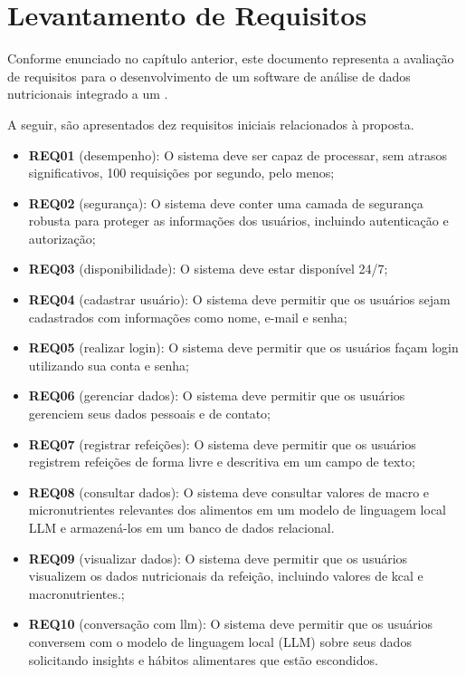 \chapter{Levantamento de Requisitos}\label{cap:2-lev-req}

Conforme enunciado no capítulo anterior, este documento representa a avaliação de requisitos para o desenvolvimento de um software de análise de dados nutricionais integrado a um .

A seguir, são apresentados dez requisitos iniciais relacionados à proposta.

\begin{itemize}
    \item \textbf{REQ01} (desempenho): O sistema deve ser capaz de processar, sem atrasos significativos, 100 requisições por segundo, pelo menos;
    \item \textbf{REQ02} (segurança): O sistema deve conter uma camada de segurança robusta para proteger as informações dos usuários, incluindo autenticação e autorização;
    \item \textbf{REQ03} (disponibilidade): O sistema deve estar disponível 24/7;
    \item \textbf{REQ04} (cadastrar usuário): O sistema deve permitir que os usuários sejam cadastrados com informações como nome, e-mail e senha;
    \item \textbf{REQ05} (realizar login): O sistema deve permitir que os usuários façam login utilizando sua conta e senha;
    \item \textbf{REQ06} (gerenciar dados): O sistema deve permitir que os usuários gerenciem seus dados pessoais e de contato;
    \item \textbf{REQ07} (registrar refeições): O sistema deve permitir que os usuários registrem refeições de forma livre e descritiva em um campo de texto;
    \item \textbf{REQ08} (consultar dados): O sistema deve consultar valores de macro e micronutrientes relevantes dos alimentos em um modelo de linguagem local LLM e armazená-los em um banco de dados relacional.
    \item \textbf{REQ09} (visualizar dados): O sistema deve permitir que os usuários visualizem os dados nutricionais da refeição, incluindo valores de kcal e macronutrientes.;
    \item \textbf{REQ10} (conversação com llm): O sistema deve permitir que os usuários conversem com o modelo de linguagem local (LLM) sobre seus dados solicitando insights e hábitos alimentares que estão escondidos.
\end{itemize}

